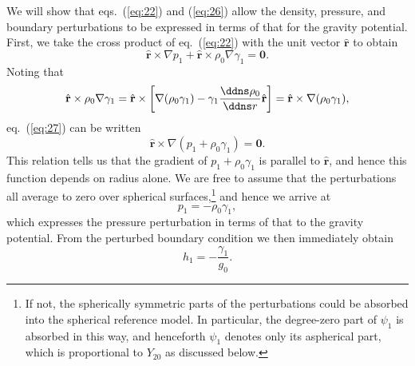 We will show that eqs.~(\ref{eq:22}) and (\ref{eq:26}) allow the density, pressure, and boundary perturbations to be expressed in terms of 
that for the gravity potential. First, we take the cross product of eq.~(\ref{eq:22}) with the unit vector $\hat{\mathbf{r}}$ to obtain
\begin{equation}
\hat{\mathbf{r}}\times\nabla p_{1}+\hat{\mathbf{r}}\times\rho_{0}\nabla\gamma_{1}=\mathbf{0}.
\label{eq:27}
\end{equation}
Noting that
\begin{equation}
\hat{\mathbf{r}}\times\rho_{0}\nabla\gamma_{1}=\hat{\mathbf{r}}\times\left[
    \nabla(\rho_{0}\gamma_{1})-\gamma_{1}\frac{\ddns \rho_{0}}{\ddns r}\hat{\mathbf{r}}
    \right]=\hat{\mathbf{r}}\times\nabla(\rho_{0}\gamma_{1}),
\label{eq:28}
\end{equation}
eq.~(\ref{eq:27}) can be written
\begin{equation}
\hat{\mathbf{r}}\times\nabla(p_{1}+\rho_{0}\gamma_{1})=\mathbf{0}.
\label{eq:29}
\end{equation}
This relation tells us that the gradient of $p_{1}+\rho_{0}\gamma_{1}$ is parallel to $\hat{\mathbf{r}}$, and hence this function
 depends on radius alone. We are free to assume that the perturbations all average to zero over spherical surfaces,\footnote{If not, 
 the spherically symmetric parts of the perturbations could be absorbed into the spherical reference model. In particular, the 
 degree-zero part of $\psi_{1}$ is absorbed in this way, and henceforth $\psi_{1}$ denotes only its aspherical part, which is 
 proportional to $Y_{20}$ as discussed below.} and hence we arrive at
\begin{equation}
p_{1}=-\rho_{0}\gamma_{1},
\label{eq:30}
\end{equation}
which expresses the pressure perturbation in terms of that to the gravity potential. From the perturbed boundary 
condition we then immediately obtain
\begin{equation}
h_{1}=-\frac{\gamma_{1}}{g_{0}}.
\label{eq:31}
\end{equation}

